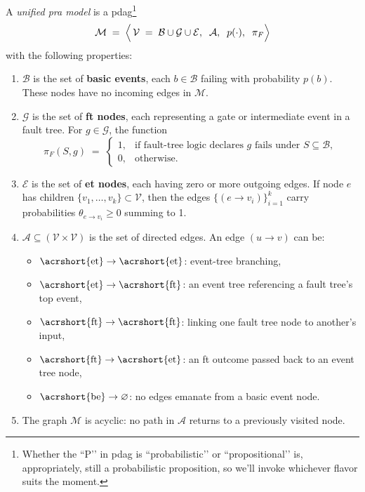 \begin{definition}
\label{def:unified_pra_dag}
A \emph{unified \acrshort{pra} model} is a \acrfull{pdag}\footnote{Whether the “P’’ in \acrshort{pdag} is “probabilistic’’ or “propositional’’ is, appropriately, still a probabilistic proposition, so we’ll invoke whichever flavor suits the moment.}
\[
\mathcal{M}
\;=\;
\Bigl\langle\,
  \mathcal{V}\;=\;\mathcal{B}\cup\mathcal{G}\cup\mathcal{E},
  \;\;\mathcal{A},
  \;\;p(\cdot),
  \;\;\pi_{F}
\Bigr\rangle
\]
with the following properties:

\begin{enumerate}
\item \(\mathcal{B}\) is the set of \textbf{basic events}, each \(b\in \mathcal{B}\) failing with probability \(p(b)\).  These nodes have no incoming edges in \(\mathcal{M}\).  
\item \(\mathcal{G}\) is the set of \textbf{\acrlong{ft} nodes}, each representing a gate or intermediate event in a fault tree.  For \(g\in \mathcal{G}\), the function
\[
\pi_{F}(S,g)\;=\;\begin{cases}
1, & \text{if fault-tree logic declares \(g\) fails under \(S\subseteq\mathcal{B}\)},\\
0, & \text{otherwise}.
\end{cases}
\]
\item \(\mathcal{E}\) is the set of \textbf{\acrlong{et} nodes}, each having zero or more outgoing edges.  If node \(e\) has children \(\{v_1,\dots,v_k\}\subset \mathcal{V}\), then the edges \(\{(e\to v_i)\}_{i=1}^k\) carry probabilities \(\theta_{e\to v_i}\ge 0\) summing to 1.  
\item \(\mathcal{A}\subseteq (\mathcal{V}\times \mathcal{V})\) is the set of directed edges.  An edge \((u\to v)\) can be:
  \begin{itemize}
  \item \(\mathrm{\acrshort{et}\to \acrshort{et}}\):  event-tree branching,  
  \item \(\mathrm{\acrshort{et}\to \acrshort{ft}}\):  an event tree referencing a fault tree's top event,  
  \item \(\mathrm{\acrshort{ft}\to \acrshort{ft}}\):  linking one fault tree node to another's input,  
  \item \(\mathrm{\acrshort{ft}\to \acrshort{et}}\):  an \acrshort{ft} outcome passed back to an event tree node,  
  \item \(\mathrm{\acrshort{be}}\to\varnothing\):  no edges emanate from a basic event node.  
  \end{itemize}
\item The graph \(\mathcal{M}\) is acyclic: no path in \(\mathcal{A}\) returns to a previously visited node.  
\end{enumerate}
\end{definition}

